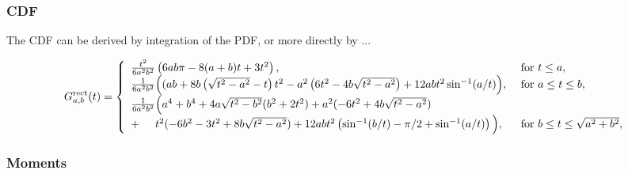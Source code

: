 \subsubsection{CDF}

The CDF can be derived by integration of the PDF, or more directly by
...

\begin{equation}
  G^{\rm rect}_{a,b}(t)  = \left\{
    \begin{array}{ll}
     \frac{t^2}{6 a^2 b^2} \left( 
       6 a b \pi - 8(a+b) t + 3 t^2
             \right),  
         & \mbox{ for } t \leq a, \\
     \frac{1}{6 a^2 b^2} \Big( 
       (ab + 8 b \left( \sqrt{t^2 - a^2} -t \right) t^2
          - a^2 \left( 6 t^2 - 4 b  \sqrt{t^2 - a^2} \right)
          + 12 a b t^2 \sin^{-1}(a/t)
             \Big),  
         & \mbox{ for } a \leq t \leq b, \\
     \frac{1}{6 a^2 b^2} \Big( 
         a^4 + b^4
        + 4 a \sqrt{t^2 - b^2} (b^2 + 2 t^2)
        + a^2 (-6 t^2 + 4 b \sqrt{t^2 - a^2}) & \\
        + \hspace{5mm} t^2 (-6 b^2 - 3 t^2 + 8 b \sqrt{t^2 - a^2})
        + 12 a b t^2 \left( 
                       \sin^{-1}(b/t) - \pi/2 + \sin^{-1}(a/t)
                     \right)
      \Big),
         & \mbox{ for } b \leq t \leq \sqrt{a^2 + b^2}, \\
    \end{array} \right. 
  \label{eqn:rectangle_cdf}   
\end{equation}


\subsubsection{Moments}

